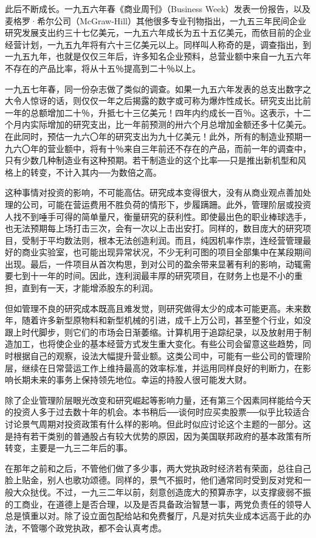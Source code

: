 \documentclass[UTF8,a4paper,zihao=-4,fontset = windows]{ctexart} %
\begin{document}
此后不断成长。一九五六年春《商业周刊》（Business Week）发表一份报告，以及麦格罗·希尔公司（McGraw-Hill）其他很多专业刊物指出，一九五三年民间企业研究发展支出约三十七亿美元，一九五六年成长为五十五亿美元，而依目前的企业经营计划，一九五九年将有六十三亿美元以上。同样叫人称奇的是，调查指出，到一九五九年，也就是仅仅三年后，许多知名企业预料，总营业额中来自一九五六年不存在的产品比率，将从十五％提高到二十％以上。

一九五七年春，同一份杂志做了类似的调查。如果一九五六年发表的总支出数字之大令人惊讶的话，则仅仅一年之后揭露的数字或可称为爆炸性成长。研究支出比前一年的总额增加二十％，升抵七十三亿美元！四年内约成长一百％。这表示，十二个月内实际增加的研究支出，比一年前预测的卅六个月总增加金额还多十亿美元。在此同时，预估一九六〇年的研究支出为九十亿美元！此外，所有的制造业预期一九六〇年的营业额中，将有十％来自三年前还不存在的产品，而前一年的调查中，只有少数几种制造业有这种预期。若干制造业的这个比率──只是推出新机型和风格上的转变，不计入其内──为数倍之高。

这种事情对投资的影响，不可能高估。研究成本变得很大，没有从商业观点善加处理的公司，可能在营运费用不胜负荷的情形下，步履蹒跚。此外，管理阶层或投资人找不到唾手可得的简单量尺，衡量研究的获利性。即使最出色的职业棒球选手，也无法预期每上场打击三次，会有一次以上击出安打。同样的，数目庞大的研究项目，受制于平均数法则，根本无法创造利润。而且，纯因机率作祟，连经营管理最好的商业实验室，也可能出现异常状况，不少无利可图的项目全部集中在某段期间出现。最后，一件项目从首次构思，到对公司的盈余带来显著有利的影响，动辄需要七到十一年的时间。因此，连利润最丰厚的研究项目，在财务上也是不小的重担，直到有一天，才能增添股东的利润。

但如管理不良的研究成本既高且难发觉，则研究做得太少的成本可能更高。未来数年，随着许多新型原物料和新型机械的引进，成千上万公司，甚至整个行业，如没跟上时代脚步，则它们的市场会日渐萎缩。计算机用于追踪纪录，以及放射用于制造加工，也将使企业的基本经营方式发生重大变化。有些公司会留意这些趋势，同时根据自己的观察，设法大幅提升营业额。这类公司中，可能有一些公司的管理阶层，继续在日常营运工作上维持最高的效率标准，并运用同样良好的判断力，在影响长期未来的事务上保持领先地位。幸运的持股人很可能发大财。

除了企业管理阶层眼光改变和研究崛起等影响力量，还有第三个因素同样能给今天的投资人多于过去数十年的机会。本书稍后──谈何时应买卖股票──似乎比较适合讨论景气周期对投资政策有什么样的影响。但此时似应讨论这个主题的一部分。这是持有若干类别的普通股占有较大优势的原因，因为美国联邦政府的基本政策有所转变，主要是一九三二年后的事。

在那年之前和之后，不管他们做了多少事，两大党执政时经济若有荣面，总往自己脸上贴金，别人也歌功颂德。同样的，景气不振时，他们通常同时受到反对党和一般大众挞伐。不过，一九三二年以前，刻意创造庞大的预算赤字，以支撑疲弱不振的工商业，在道德上是否合理，以及是否具备政治智慧一事，两党负责任的领导人总是慎重以对。除了设立面包配给站和免费餐厅，凡是对抗失业成本远高于此的办法，不管哪个政党执政，都不会认真考虑。
\end{document}
